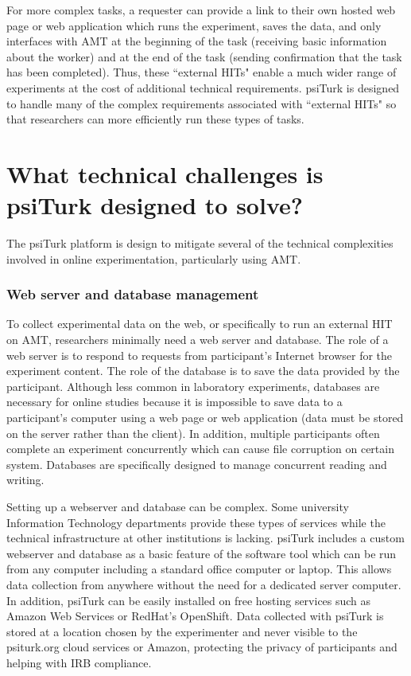 \documentclass[twocolumn]{svjour3}          %
\begin{document}
For more complex tasks, a requester can provide a link to their own hosted web page or
web application which runs the 
experiment, saves the data, and only interfaces with AMT at the beginning of the task (receiving 
basic information about the worker) and at the end of the task (sending confirmation that the task 
has been completed).  Thus, these ``external HITs" enable a much wider range of experiments at 
the cost of additional technical requirements.  \textsf{psiTurk} is designed to handle many of the 
complex requirements associated with ``external HITs" so that researchers can more efficiently run 
these types of tasks.



\section{What technical challenges is \textsf{psiTurk} designed to solve?}

The \textsf{psiTurk} platform is design to mitigate several of the technical complexities
involved in online experimentation, particularly using AMT.

\subsubsection{Web server and database management} 
To collect experimental data on the web, or specifically to run an external HIT on AMT, 
researchers minimally need a web server and database.  
The role of a web server is to respond to requests from participant's Internet browser 
for the experiment content.  The role of the database is to save the data provided by 
the participant.  Although less common in laboratory experiments, databases are 
necessary for online studies because it is impossible to save data to a participant's 
computer using a web page or web application (data must be stored on the server
rather than the client).  In addition, multiple participants often complete an 
experiment concurrently which can cause file corruption on certain system.  
Databases are specifically designed to manage concurrent reading and writing.
 
Setting up a webserver and database can be complex.  Some university Information
Technology departments
provide these types of services while the technical infrastructure at other 
institutions is lacking.  \textsf{psiTurk} includes a custom webserver and database
as a basic feature of the software tool which can be run from any computer
including a standard office computer or laptop.  This allows data collection from
anywhere without the need for a dedicated server computer.  In addition, \textsf{psiTurk}
can be easily installed on free hosting services such as Amazon Web Services
or RedHat's OpenShift.  Data collected with \textsf{psiTurk} is stored at a location
chosen by the experimenter and never visible to the \textsf{psiturk.org} cloud
services or Amazon, protecting the privacy of participants and helping with IRB compliance.
\end{document}
